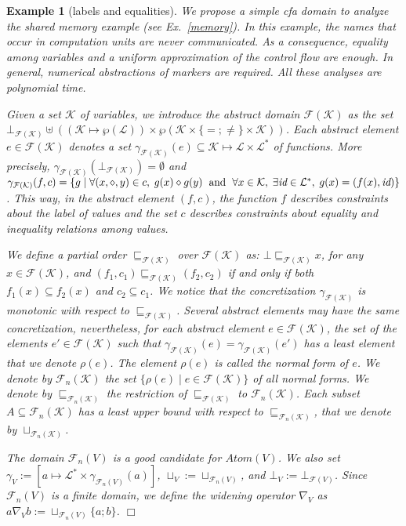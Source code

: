 \documentclass{article}
\newcommand{\bydef}{:=}
\newcommand{\boxexample}{$\Box$}
\newtheorem{example}[thm]{Example}
\newcommand{\Labels}{\mathcal{L}}
\newcommand{\flowdom}[1]{\mathcal{F}(#1)}
\newcommand{\flowsub}[1]{\sqsubseteq_{\flowdom{#1}}}
\newcommand{\flowconc}[1]{\gamma_{\flowdom{#1}}}
\newcommand{\flowbot}[1]{\bot_{\flowdom{#1}}}
\newcommand{\normalflowdom}[1]{\mathcal{F}_{n}(#1)}
\newcommand{\normalflowsub}[1]{\sqsubseteq_{\normalflowdom{#1}}}
\newcommand{\normalflowconc}[1]{\gamma_{\normalflowdom{#1}}}
\newcommand{\normalflowcup}[1]{\sqcup_{\normalflowdom{#1}}}
\newcommand{\Markers}{\Labels^{\ast}}
\newcommand{\Atomekey}{\textit{Atom}}
\newcommand{\Atomeshortkey}{}
\newcommand{\Atome}[1]{\Atomekey(#1)}
\newcommand{\gammaatome}[1]{\gamma^{\Atomeshortkey}_{#1}}
\newcommand{\cupatome}[1]{\sqcup^{\Atomeshortkey}_{#1}}
\newcommand{\botatome}[1]{\bot^{\Atomeshortkey}_{#1}}
\newcommand{\widatome}[1]{\nabla^{\Atomeshortkey}_{#1}}
\newcommand{\cfadomain}{labels and equalities}
\newcommand{\icfadomain}{\cfadomain}
\newcommand{\var}{\mathcal{K}}
\begin{document}
\begin{example}[\icfadomain]
\label{cfadomain}
We propose a simple \emph{cfa} domain to analyze the shared memory example (see Ex.~\ref{memory}).  In this example, the names that occur in computation units are never communicated. As a consequence, equality  among variables \cite[Sect.~5.1.1]{feret:esop2002}  and a uniform approximation of the control flow \cite{nielson:journal,nielson:concur98} are enough. In general, numerical abstractions of markers \cite{feret:sas2000,feret:esop2002}  are required. All these analyses \cite{nielson:journal,nielson:concur98,feret:esop2002,feret:sas2000} are polynomial time.

Given a set $\var$ of variables, we introduce the abstract domain 
$\flowdom{\var}$ as the set $\flowbot{\var} \uplus ((\var\mapsto \wp(\Labels))\times \wp(\var\times\{=;\not =\}\times \var))$. Each abstract element $e\in\flowdom{\var}$ denotes a set $\flowconc{\var}(e)\subseteq \var \mapsto \Labels\times \Markers$ of functions. More precisely, $\flowconc{\var}(\flowbot{\var})=\emptyset$ and $\flowconc{\var}(f,c)=\{g\;|\;
\forall (x,\diamond,y)\in c,\;g(x)\diamond g(y) \text{\; and\; } \forall x\in\var,\;\exists\textit{id}\in\Markers,\;g(x)=(f(x),\textit{id})\}$. This way, in the abstract element $(f,c)$, the function $f$ describes constraints about the label of values and the set $c$ describes constraints about equality and inequality relations among values.

We define a partial order $\flowsub{\var}$ over $\flowdom{\var}$ as: $\bot \flowsub{\var} x$, for any $x\in\flowdom{\var}$, and $(f_1,c_1) \flowsub{\var} (f_2,c_2)$ if and only if both $f_1(x)\subseteq f_2(x)$ and $c_2\subseteq c_1$. 
We notice that the concretization $\flowconc{\var}$ is monotonic with respect to $\flowsub{\var}$. Several abstract elements may have the same concretization, nevertheless, for each abstract element $e\in\flowdom{\var}$, the set of the elements $e'\in\flowdom{\var}$ such that $\flowconc{\var}(e)=\flowconc{\var}(e')$ has a least element that we denote $\rho(e)$. The element $\rho(e)$ is called the normal form of $e$. We denote by $\normalflowdom{\var}$ the set $\{\rho(e)\;|\;e\in\flowdom{\var}\}$ of all normal forms. We denote by $\normalflowsub{\var}$ the restriction of $\flowsub{\var}$ to $\normalflowdom{\var}$. Each subset $A\subseteq \normalflowdom{\var}$ has a least upper bound with respect to $\normalflowsub{\var}$, that we denote by $\normalflowcup{\var}$. 

The domain $\normalflowdom{V}$ is a good candidate for $\Atome{V}$. 
We also set $\gammaatome{V}\bydef[a \mapsto \Markers \times \normalflowconc{V}(a)]$, 
$\cupatome{V}\bydef\normalflowcup{V}$, and $\botatome{V}\bydef\flowbot{V}$. Since $\normalflowdom{V}$ is a finite domain, we define the widening operator $\widatome{V}$ as $a\widatome{V} b \bydef \normalflowcup{V}\{a;b\}$.
\boxexample\end{example}
\end{document}

